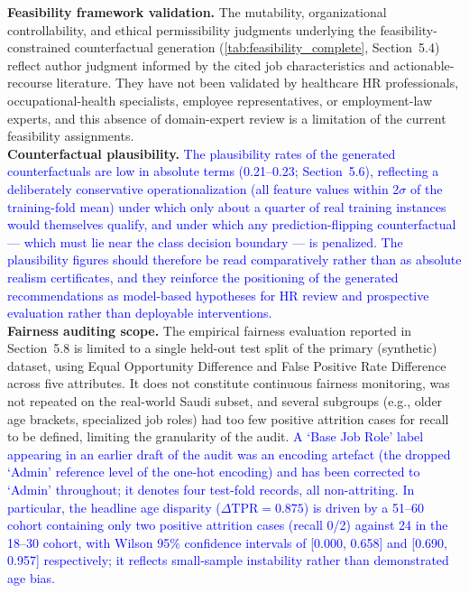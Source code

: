 \documentclass[a4paper,fleqn]{cas-sc}
\begin{document}
{\textbf{Feasibility framework validation.} The mutability, organizational controllability, and ethical permissibility judgments underlying the feasibility-constrained counterfactual generation (\cref{tab:feasibility_complete}, Section~5.4) reflect author judgment informed by the cited job characteristics and actionable-recourse literature. They have not been validated by healthcare HR professionals, occupational-health specialists, employee representatives, or employment-law experts, and this absence of domain-expert review is a limitation of the current feasibility assignments.\\
\textbf{Counterfactual plausibility.} \textcolor{blue}{The plausibility rates of the generated counterfactuals are low in absolute terms (0.21--0.23; Section~5.6), reflecting a deliberately conservative operationalization (all feature values within 2$\sigma$ of the training-fold mean) under which only about a quarter of real training instances would themselves qualify, and under which any prediction-flipping counterfactual --- which must lie near the class decision boundary --- is penalized. The plausibility figures should therefore be read comparatively rather than as absolute realism certificates, and they reinforce the positioning of the generated recommendations as model-based hypotheses for HR review and prospective evaluation rather than deployable interventions.}\\
\textbf{Fairness auditing scope.} The empirical fairness evaluation reported in Section~5.8 is limited to a single held-out test split of the primary (synthetic) dataset, using Equal Opportunity Difference and False Positive Rate Difference across five attributes. It does not constitute continuous fairness monitoring, was not repeated on the real-world Saudi subset, and several subgroups (e.g., older age brackets, specialized job roles) had too few positive attrition cases for recall to be defined, limiting the granularity of the audit. \textcolor{blue}{A `Base Job Role' label appearing in an earlier draft of the audit was an encoding artefact (the dropped `Admin' reference level of the one-hot encoding) and has been corrected to `Admin' throughout; it denotes four test-fold records, all non-attriting.} \textcolor{blue}{In particular, the headline age disparity ($\Delta\text{TPR} = 0.875$) is driven by a 51–60 cohort containing only two positive attrition cases (recall 0/2) against 24 in the 18–30 cohort, with Wilson 95\% confidence intervals of [0.000, 0.658] and [0.690, 0.957] respectively; it reflects small-sample instability rather than demonstrated age bias.}\\
}
\end{document}
